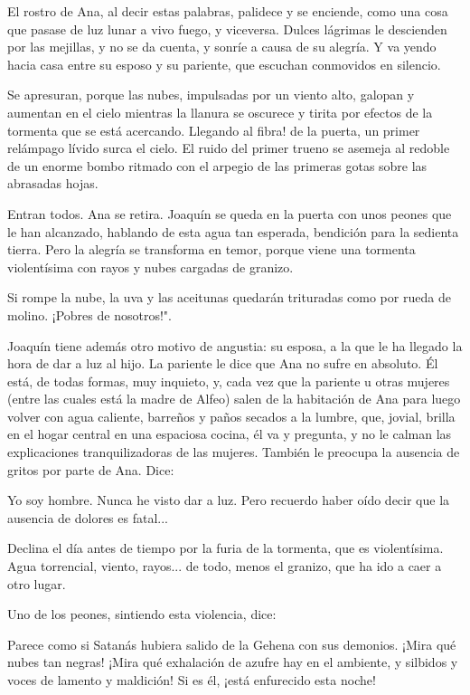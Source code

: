 \documentclass[12pt]{book} %
\begin{document}
El rostro de Ana, al decir estas palabras, palidece y se enciende, como una cosa que pasase de luz lunar a vivo fuego, y viceversa. Dulces lágrimas le descienden por las mejillas, y no se da cuenta, y sonríe a causa de su alegría. Y va yendo hacia casa entre su esposo y su pariente, que escuchan conmovidos en silencio. 

Se apresuran, porque las nubes, impulsadas por un viento alto, galopan y aumentan en el cielo mientras la llanura se oscurece y tirita por efectos de la tormenta que se está acercando. Llegando al fibra! de la puerta, un primer relámpago lívido surca el cielo. El ruido del primer trueno se asemeja al redoble de un enorme bombo ritmado con el arpegio de las primeras gotas sobre las abrasadas hojas. 

Entran todos. Ana se retira. Joaquín se queda en la puerta con unos peones que le han alcanzado, hablando de esta agua tan esperada, bendición para la sedienta tierra. Pero la alegría se transforma en temor, porque viene una tormenta violentísima con rayos y nubes cargadas de granizo. 

Si rompe la nube, la uva y las aceitunas quedarán trituradas como por rueda de molino. ¡Pobres de nosotros!". 

Joaquín tiene además otro motivo de angustia: su esposa, a la que le ha llegado la hora de dar a luz al hijo. La pariente le dice que Ana no sufre en absoluto. Él está, de todas formas, muy inquieto, y, cada vez que la pariente u otras mujeres (entre las cuales está la madre de Alfeo) salen de la habitación de Ana para luego volver con agua caliente, barreños y paños secados a la lumbre, que, jovial, brilla en el hogar central en una espaciosa cocina, él va y pregunta, y no le calman las explicaciones tranquilizadoras de las mujeres. También le preocupa la ausencia de gritos por parte de Ana. Dice: 

Yo soy hombre. Nunca he visto dar a luz. Pero recuerdo haber oído decir que la ausencia de dolores es fatal...

Declina el día antes de tiempo por la furia de la tormenta, que es violentísima. Agua torrencial, viento, rayos... de todo, menos el granizo, que ha ido a caer a otro lugar. 

Uno de los peones, sintiendo esta violencia, dice: 

Parece como si Satanás hubiera salido de la Gehena con sus demonios. ¡Mira qué nubes tan negras! ¡Mira qué exhalación de azufre hay en el ambiente, y silbidos y voces de lamento y maldición! Si es él, ¡está enfurecido esta noche! 
\end{document}

